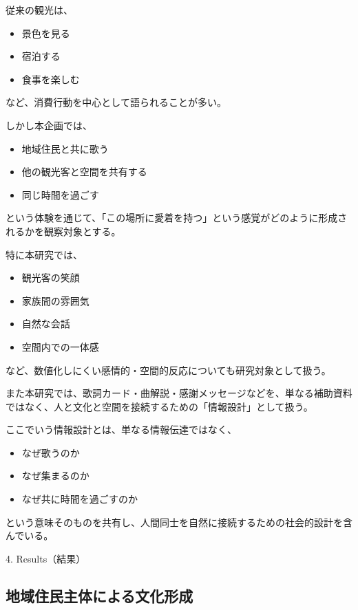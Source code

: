 従来の観光は、

\begin{itemize}
\item 景色を見る
\item 宿泊する
\item 食事を楽しむ
\end{itemize}

など、消費行動を中心として語られることが多い。

しかし本企画では、

\begin{itemize}
\item 地域住民と共に歌う
\item 他の観光客と空間を共有する
\item 同じ時間を過ごす
\end{itemize}

という体験を通じて、「この場所に愛着を持つ」という感覚がどのように形成されるかを観察対象とする。

特に本研究では、

\begin{itemize}
\item 観光客の笑顔
\item 家族間の雰囲気
\item 自然な会話
\item 空間内での一体感
\end{itemize}

など、数値化しにくい感情的・空間的反応についても研究対象として扱う。

また本研究では、歌詞カード・曲解説・感謝メッセージなどを、単なる補助資料ではなく、人と文化と空間を接続するための「情報設計」として扱う。

ここでいう情報設計とは、単なる情報伝達ではなく、

\begin{itemize}
\item なぜ歌うのか
\item なぜ集まるのか
\item なぜ共に時間を過ごすのか
\end{itemize}

という意味そのものを共有し、人間同士を自然に接続するための社会的設計を含んでいる。

4. Results（結果）


\subsection{地域住民主体による文化形成}

